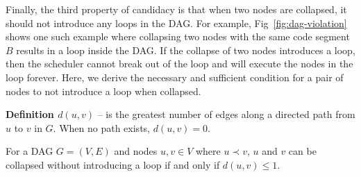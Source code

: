 Finally, the third property of candidacy is that when two nodes are collapsed, it should not introduce any loops in the DAG. For example, Fig~\ref{fig:dag-violation} shows one such example where collapsing two nodes with the same code segment $B$ results in a loop inside the DAG. If the collapse of two nodes introduces a loop, then the scheduler cannot break out of the loop and will execute the nodes in the loop forever. Here, we derive the necessary and sufficient condition for a pair of nodes to not introduce a loop when collapsed.




\textbf{Definition ${d(u, v)}$} -- is the greatest number of edges
along a directed path from ${u}$ to ${v}$ in ${G}$. When no path
exists, ${d(u,v) = 0}$.

\begin{theorem}
  For a DAG ${G = (V, E)}$ and nodes ${u, v \in V}$ where ${u \prec
    v}$, ${u}$ and ${v}$ can be collapsed without introducing a loop
  if and  only if ${d(u, v) \le 1}$.
\end{theorem}



